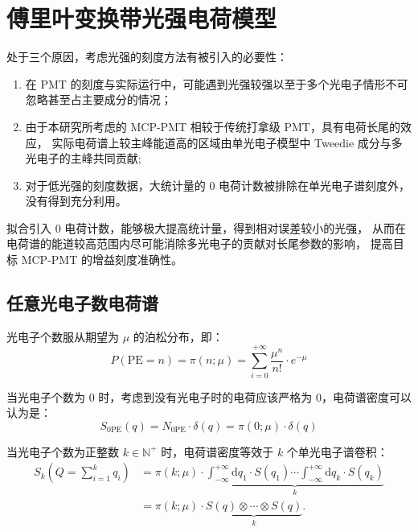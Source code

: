 \section{傅里叶变换带光强电荷模型}\label{sec:fourier}
处于三个原因，考虑光强的刻度方法有被引入的必要性：
\begin{enumerate}
    \item 在 PMT 的刻度与实际运行中，可能遇到光强较强以至于多个光电子情形不可忽略甚至占主要成分的情况；
    \item 由于本研究所考虑的 MCP-PMT 相较于传统打拿级 PMT，具有电荷长尾的效应，
    实际电荷谱上较主峰能道高的区域由单光电子模型中 Tweedie 成分与多光电子的主峰共同贡献;
    \item 对于低光强的刻度数据，大统计量的 0 电荷计数被排除在单光电子谱刻度外，没有得到充分利用。
\end{enumerate}

拟合引入 0 电荷计数，能够极大提高统计量，得到相对误差较小的光强，
从而在电荷谱的能道较高范围内尽可能消除多光电子的贡献对长尾参数的影响，
提高目标 MCP-PMT 的增益刻度准确性。

\subsection{任意光电子数电荷谱}\label{sec:dft}
光电子个数服从期望为 $\mu$ 的泊松分布，即：
\begin{equation}
    P(\text{PE}=n) = \pi(n;\mu)=\sum_{i=0}^{+\infty}\frac{\mu^{n}}{n!}\cdot e^{-\mu}
\end{equation}

当光电子个数为 0 时，考虑到没有光电子时的电荷应该严格为 0，电荷谱密度可以认为是：
\begin{equation}
    S_{0\text{PE}}(q)=N_{0\text{PE}}\cdot\delta(q)=\pi(0;\mu)\cdot\delta(q)
\end{equation}

当光电子个数为正整数 $k\in\mathbb{N}^{+}$ 时，电荷谱密度等效于 $k$ 个单光电子谱卷积：
\begin{equation}
    \begin{aligned}
        S_{k}(Q = \sum_{i = 1}^{k} q_i ) 
        & = \pi(k;\mu)\cdot\underbrace{
        \int_{-\infty }^{+\infty}\mathrm{d}q_1\cdot S(q_1)
        \cdots \int_{-\infty }^{+\infty}\mathrm{d}q_k\cdot S(q_k)
        }_{k}\\
        &=\pi(k;\mu)\cdot\underbrace{S(q)\otimes\cdots\otimes S(q)}_{k}.
    \end{aligned}
    \label{eq:kpe-charge}
\end{equation}

